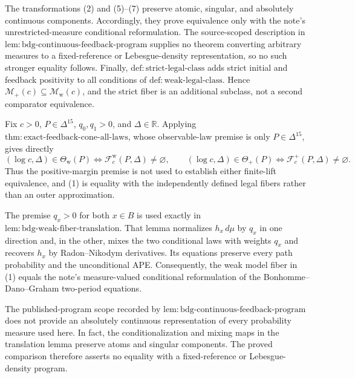The transformations (2) and (5)--(7) preserve atomic, singular, and absolutely continuous components.  Accordingly, they prove equivalence only with the note's unrestricted-measure conditional reformulation.  The source-scoped description in \(\mathrm{lem{:}bdg\text{-}continuous\text{-}feedback\text{-}program}\) supplies no theorem converting arbitrary measures to a fixed-reference or Lebesgue-density representation, so no such stronger equality follows.  Finally, \(\mathrm{def{:}strict\text{-}legal\text{-}class}\) adds strict initial and feedback positivity to all conditions of \(\mathrm{def{:}weak\text{-}legal\text{-}class}\).  Hence \(\mathcal M_+(c)\subseteq\mathcal M_{\mathrm w}(c)\), and the strict fiber is an additional subclass, not a second comparator equivalence.

Fix \(c>0\), \(P\in\Delta^{15}\), \(q_0,q_1>0\), and \(\Delta\in\mathbb R\).  Applying \(\mathrm{thm{:}exact\text{-}feedback\text{-}cone\text{-}all\text{-}laws}\), whose observable-law premise is only \(P\in\Delta^{15}\), gives directly
\[
 (\log c,\Delta)\in\Theta_{\mathrm w}(P)
 \Longleftrightarrow \mathcal F_c^{\mathrm w}(P,\Delta)\ne\varnothing,
 \qquad
 (\log c,\Delta)\in\Theta_+(P)
 \Longleftrightarrow \mathcal F_c^+(P,\Delta)\ne\varnothing. \tag{1}
\]
Thus the positive-margin premise is not used to establish either finite-lift equivalence, and (1) is equality with the independently defined legal fibers rather than an outer approximation.

The premise \(q_x>0\) for both \(x\in B\) is used exactly in \(\mathrm{lem{:}bdg\text{-}weak\text{-}fiber\text{-}translation}\).  That lemma normalizes \(h_x\,d\mu\) by \(q_x\) in one direction and, in the other, mixes the two conditional laws with weights \(q_x\) and recovers \(h_x\) by Radon--Nikodym derivatives.  Its equations preserve every path probability and the unconditional APE.  Consequently, the weak model fiber in (1) equals the note's measure-valued conditional reformulation of the Bonhomme--Dano--Graham two-period equations.

The published-program scope recorded by \(\mathrm{lem{:}bdg\text{-}continuous\text{-}feedback\text{-}program}\) does not provide an absolutely continuous representation of every probability measure used here.  In fact, the conditionalization and mixing maps in the translation lemma preserve atoms and singular components.  The proved comparison therefore asserts no equality with a fixed-reference or Lebesgue-density program.

